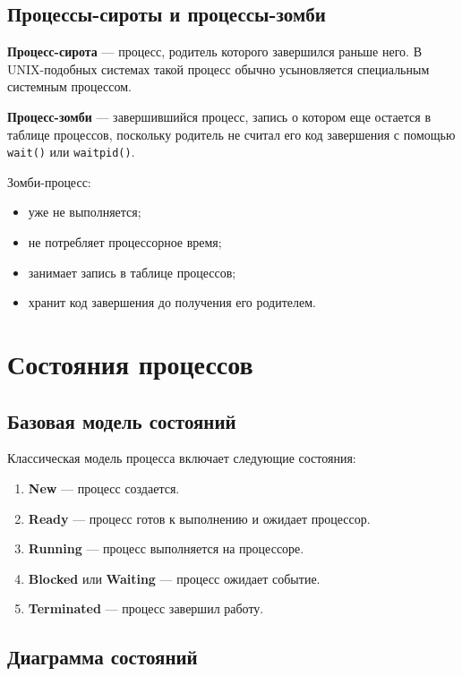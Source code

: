 \documentclass[12pt,a4paper]{article}
\begin{document}
\subsection{Процессы-сироты и процессы-зомби}

\textbf{Процесс-сирота} --- процесс, родитель которого завершился раньше него. В UNIX-подобных системах такой процесс обычно усыновляется специальным системным процессом.

\textbf{Процесс-зомби} --- завершившийся процесс, запись о котором еще остается в таблице процессов, поскольку родитель не считал его код завершения с помощью \texttt{wait()} или \texttt{waitpid()}.

Зомби-процесс:
\begin{itemize}
    \item уже не выполняется;
    \item не потребляет процессорное время;
    \item занимает запись в таблице процессов;
    \item хранит код завершения до получения его родителем.
\end{itemize}

\section{Состояния процессов}

\subsection{Базовая модель состояний}

Классическая модель процесса включает следующие состояния:

\begin{enumerate}
    \item \textbf{New} --- процесс создается.
    \item \textbf{Ready} --- процесс готов к выполнению и ожидает процессор.
    \item \textbf{Running} --- процесс выполняется на процессоре.
    \item \textbf{Blocked} или \textbf{Waiting} --- процесс ожидает событие.
    \item \textbf{Terminated} --- процесс завершил работу.
\end{enumerate}

\subsection{Диаграмма состояний}
\end{document}

